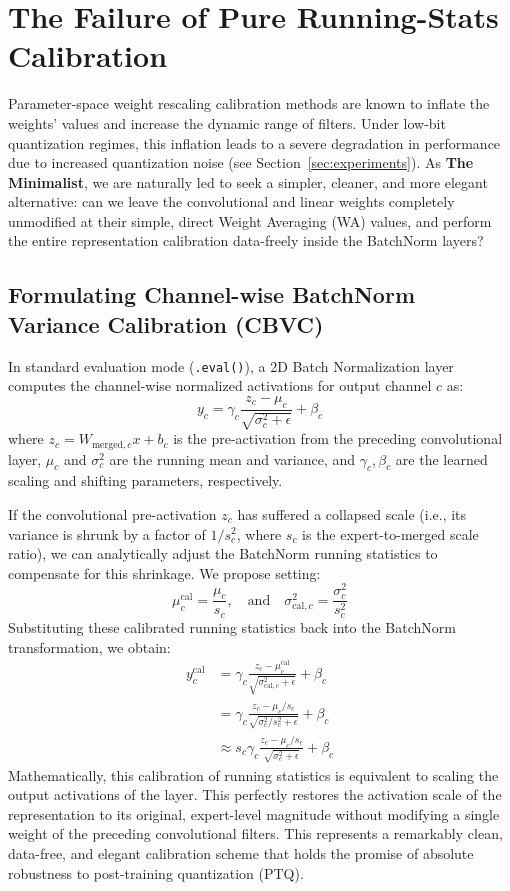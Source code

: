 \documentclass{article}
\begin{document}
\section{The Failure of Pure Running-Stats Calibration}
\label{sec:cbvc}
Parameter-space weight rescaling calibration methods are known to inflate the weights' values and increase the dynamic range of filters. Under low-bit quantization regimes, this inflation leads to a severe degradation in performance due to increased quantization noise (see Section~\ref{sec:experiments}). As \textbf{The Minimalist}, we are naturally led to seek a simpler, cleaner, and more elegant alternative: can we leave the convolutional and linear weights completely unmodified at their simple, direct Weight Averaging (WA) values, and perform the entire representation calibration data-freely inside the BatchNorm layers?

\subsection{Formulating Channel-wise BatchNorm Variance Calibration (CBVC)}
In standard evaluation mode (\texttt{.eval()}), a 2D Batch Normalization layer computes the channel-wise normalized activations for output channel $c$ as:
\begin{equation}
    y_c = \gamma_c \frac{z_c - \mu_c}{\sqrt{\sigma^2_c + \epsilon}} + \beta_c
\end{equation}
where $z_c = W_{\text{merged}, c} x + b_c$ is the pre-activation from the preceding convolutional layer, $\mu_c$ and $\sigma^2_c$ are the running mean and variance, and $\gamma_c, \beta_c$ are the learned scaling and shifting parameters, respectively.

If the convolutional pre-activation $z_c$ has suffered a collapsed scale (i.e., its variance is shrunk by a factor of $1/s_c^2$, where $s_c$ is the expert-to-merged scale ratio), we can analytically adjust the BatchNorm running statistics to compensate for this shrinkage. We propose setting:
\begin{equation}
    \mu^{\text{cal}}_c = \frac{\mu_c}{s_c}, \quad \text{and} \quad \sigma^2_{\text{cal}, c} = \frac{\sigma^2_c}{s_c^2}
\end{equation}
Substituting these calibrated running statistics back into the BatchNorm transformation, we obtain:
\begin{align}
    y^{\text{cal}}_c &= \gamma_c \frac{z_c - \mu^{\text{cal}}_c}{\sqrt{\sigma^2_{\text{cal}, c} + \epsilon}} + \beta_c \\
    &= \gamma_c \frac{z_c - \mu_c/s_c}{\sqrt{\sigma^2_c/s_c^2 + \epsilon}} + \beta_c \\
    &\approx s_c \gamma_c \frac{z_c - \mu_c/s_c}{\sqrt{\sigma^2_c + \epsilon}} + \beta_c
\end{align}
Mathematically, this calibration of running statistics is equivalent to scaling the output activations of the layer. This perfectly restores the activation scale of the representation to its original, expert-level magnitude without modifying a single weight of the preceding convolutional filters. This represents a remarkably clean, data-free, and elegant calibration scheme that holds the promise of absolute robustness to post-training quantization (PTQ).
\end{document}
